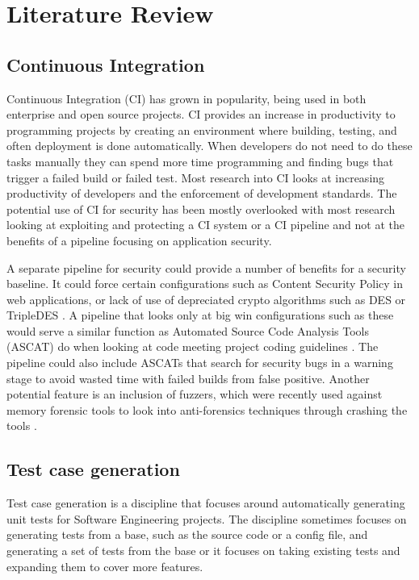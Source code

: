 \section{Literature Review}

\subsection{Continuous Integration}
    Continuous Integration (CI) has grown in popularity, being used in both enterprise and open source projects. CI provides an increase in productivity to programming projects by creating an 
    environment where building, testing, and often deployment is done automatically. When developers do not need to do these tasks manually they can spend more time programming and finding bugs that 
    trigger a failed build or failed test. Most research into CI looks at increasing productivity of developers and the enforcement of development standards. The potential use of CI for security has 
    been mostly overlooked with most research looking at exploiting and protecting a CI system or a CI pipeline and not at the benefits of a pipeline focusing on application security.

	A separate pipeline for security could provide a number of benefits for a security baseline. It could force certain configurations such as Content Security Policy in web applications, or lack of 
    use of depreciated crypto algorithms such as DES or TripleDES \cite{Vehent}. A pipeline that looks only at big win configurations such as these would serve a similar function as Automated Source 
    Code Analysis Tools (ASCAT) do when looking at code meeting project coding guidelines \cite{Zampetti}. The pipeline could also include ASCATs that search for security bugs in a warning stage to 
    avoid wasted time with failed builds from false positive. Another potential feature is an inclusion of fuzzers, which were recently used against memory forensic tools to look into anti-forensics 
    techniques through crashing the tools \cite{Case}.

\subsection{Test case generation}
    Test case generation is a discipline that focuses around automatically generating unit tests for Software Engineering projects. The discipline sometimes focuses on generating tests from a base,
    such as the source code or a config file, and generating a set of tests from the base or it focuses on taking existing tests and expanding them to cover more features.

